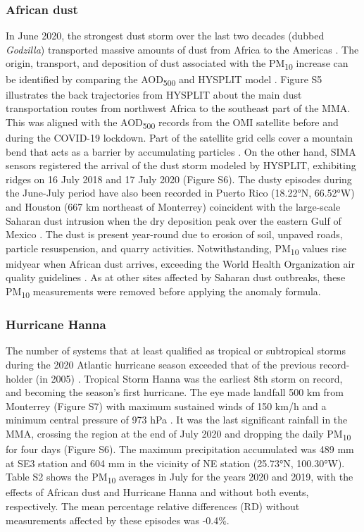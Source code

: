 \documentclass[sn-mathphys-num]{sn-jnl}
\begin{document}
\subsubsection{African dust}
In June 2020, the strongest dust storm over the last two decades (dubbed \textit{Godzilla}) transported massive amounts of dust from Africa to the Americas \citep{Francis_2020}. The origin, transport, and deposition of dust associated with the PM\textsubscript{10} increase can be identified by comparing the AOD\textsubscript{500} and HYSPLIT model \citep{Yassin_2018}. Figure S5 illustrates the back trajectories from HYSPLIT about the main dust transportation routes from northwest Africa to the southeast part of the MMA. This was aligned with the AOD\textsubscript{500} records from the OMI satellite before and during the COVID-19 lockdown. Part of the satellite grid cells cover a mountain bend that acts as a barrier by accumulating particles \citep{Gonz_lez_Santiago_2011,Martinez_2012}. On the other hand, SIMA sensors registered the arrival of the dust storm modeled by HYSPLIT, exhibiting ridges on 16 July 2018 and 17 July 2020 (Figure S6). The dusty episodes during the June-July period have also been recorded in Puerto Rico (18.22°N, 66.52°W) \citep{Euphrasie_Clotilde_2020} and Houston (667 km northeast of Monterrey) coincident with the large-scale Saharan dust intrusion \citep{Bozlaker_2013} when the dry deposition peak over the eastern Gulf of Mexico \citep{Lenes_2012}. The dust is present year-round due to erosion of soil, unpaved roads, particle resuspension, and quarry activities. Notwithstanding, PM\textsubscript{10} values rise midyear when African dust arrives, exceeding the World Health Organization air quality guidelines \citep{Prospero_2014}. As at other sites affected by Saharan dust outbreaks, these PM\textsubscript{10} measurements were removed \citep{Clemente_2022} before applying the anomaly formula.
\subsubsection{Hurricane Hanna}
The number of systems that at least qualified as tropical or subtropical storms during the 2020 Atlantic hurricane season exceeded that of the previous record-holder (in 2005) \citep{stefano2021,Beven_2021}. Tropical Storm Hanna was the earliest 8th storm on record, and becoming the season's first hurricane. The eye made landfall 500 km from Monterrey (Figure S7) with maximum sustained winds of 150 km/h and a minimum central pressure of 973 hPa \citep{conagua}. It was the last significant rainfall in the MMA, crossing the region at the end of July 2020 and dropping the daily PM\textsubscript{10} for four days (Figure S6). The maximum precipitation accumulated was 489 mm at SE3 station and 604 mm in the vicinity of NE station (25.73°N, 100.30°W). Table S2 shows the PM\textsubscript{10} averages in July for the years 2020 and 2019, with the effects of African dust and Hurricane Hanna and without both events, respectively. The mean percentage relative differences (RD) without measurements affected by these episodes was -0.4\%.
\end{document}
